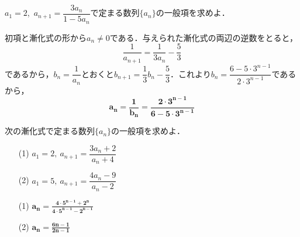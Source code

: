 \documentclass[a4paper,11pt]{ltjsarticle}
\begin{document}
\begin{toi}
  $a_1=2$,~$a_{n+1}=\dfrac{3a_n}{1-5a_n}$で定まる数列$\{a_n\}$の一般項を求めよ．
\end{toi}
\ans 
初項と漸化式の形から$a_n\neq0$である．与えられた漸化式の両辺の逆数をとると，
\[\frac{1}{a_{n+1}} = \frac{1}{3a_n}-\frac53\]
であるから，$b_n=\dfrac1{a_n}$とおくと$b_{n+1} = \dfrac13b_n-\dfrac53$．これより$b_n=\dfrac{6-5\cdot 3^{n-1}}{2\cdot3^{n-1}}$であるから，
\[\boldsymbol{a_n = \frac{1}{b_n}  = \frac{2\cdot3^{n-1}}{6-5\cdot3^{n-1}}}\]
\begin{toi}
次の漸化式で定まる数列$\{a_n\}$の一般項を求めよ．\\[5pt]
\begin{minipage}{0.5\linewidth}
\begin{itemize}
    \item [(1)]$a_1=2,~a_{n+1}=\dfrac{3a_n+2}{a_n+4}$
\end{itemize}
\end{minipage}
\begin{minipage}{0.5\linewidth}
\begin{itemize}
    \item [(2)]$a_1=5,~a_{n+1}=\dfrac{4a_n-9}{a_n-2}$
\end{itemize}
\end{minipage}
\end{toi}
\ans 
\begin{minipage}{0.5\linewidth}
\begin{itemize}
    \item [(1)]
$\displaystyle{\boldsymbol{a_n =  \frac{4\cdot5^{n-1}+2^n}{4\cdot5^{n-1}-2^{n-1}}}}$
\end{itemize}
\end{minipage}
\begin{minipage}{0.5\linewidth}
\begin{itemize}
\item[(2)]$\displaystyle{\boldsymbol{a_n =  \frac{6n-1}{2n-1}}}$
\end{itemize}
\end{minipage}
\end{document}
